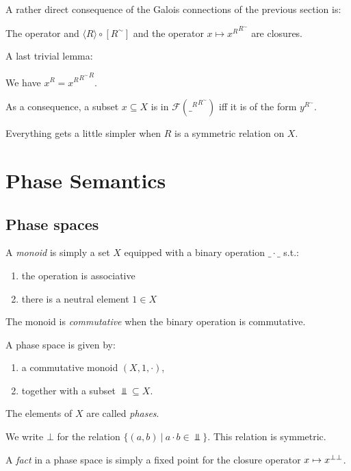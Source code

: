 A rather direct consequence of the Galois connections of the previous
section is:

\begin{lemma}
The operator and $\langle R\rangle \circ [R^\sim]$ and the operator $x\mapsto {x^R}^{R^\sim}$ are closures.
\end{lemma}

A last trivial lemma:

\begin{lemma}
We have $x^R = {{x^R}^{R^\sim}}^{R}$.

As a consequence, a subset $x\subseteq X$ is in $\mathcal{F}({\_^R}^{R^\sim})$ iff it is of the form $y^{R^\sim}$.
\end{lemma}

\begin{remark}
Everything gets a little simpler when $R$ is a symmetric relation on $X$.
\end{remark}

\section{Phase Semantics}\label{phase-semantics-1}

\subsection{Phase spaces}\label{phase-spaces}

\begin{definition}[monoid]
A \emph{monoid} is simply a set $X$ equipped with a binary operation $\_\cdot\_$ s.t.:
\begin{enumerate}
\item the operation is associative
\item there is a neutral element $1\in X$
\end{enumerate}
The monoid is \emph{commutative} when the binary operation is commutative.
\end{definition}

\begin{definition}
A phase space is given by:
\begin{enumerate}
\item a commutative monoid $(X,1,\cdot)$,
\item together with a subset $\Bot\subseteq X$.
\end{enumerate}
The elements of $X$ are called \emph{phases}.

We write $\bot$ for the relation $\{(a,b)\ |\ a\cdot b \in \Bot\}$. This relation is symmetric.

A \emph{fact} in a phase space is simply a fixed point for the closure operator $x\mapsto x^{\bot\bot}$.
\end{definition}


